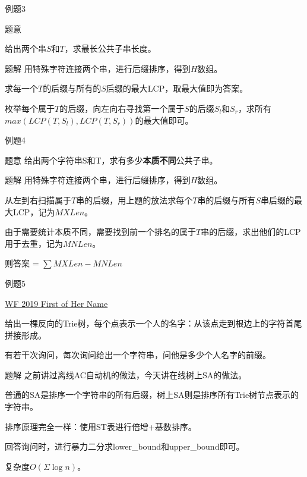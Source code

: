 \documentclass[usenames,dvipsnames]{ctexbeamer}		%
\begin{document}
\begin{frame}{例题3}
    
\begin{block}{题意}

给出两个串$S$和$T$，求最长公共子串长度。

\end{block}

\pause

\begin{block}{题解}
用特殊字符连接两个串，进行后缀排序，得到$H$数组。

求每一个$T$的后缀与所有的$S$后缀的最大LCP，取最大值即为答案。

枚举每个属于$T$的后缀，向左向右寻找第一个属于$S$的后缀$S_l$和$S_r$，求所有$max(LCP(T,S_l), LCP(T,S_r))$的最大值即可。
\end{block}
\end{frame}
\begin{frame}{例题4}

\begin{block}{题意}
给出两个字符串S和T，求有多少\textbf{本质不同}公共子串。
\end{block}
    
\pause

\begin{block}{题解}
用特殊字符连接两个串，进行后缀排序，得到$H$数组。

从左到右扫描属于$T$串的后缀，用上题的放法求每个$T$串的后缀与所有$S$串后缀的最大LCP，记为$MXLen$。

由于需要统计本质不同，需要找到前一个排名的属于$T$串的后缀，求出他们的LCP用于去重，记为$MNLen$。

则答案 = $\sum{MXLen - MNLen}$
\end{block}
\end{frame}

\begin{frame}{例题5}

\begin{block}{\href{https://ac.nowcoder.com/acm/problem/233969}{WF 2019 First of Her Name}}

给出一棵反向的Trie树，每个点表示一个人的名字：从该点走到根边上的字符首尾拼接形成。

有若干次询问，每次询问给出一个字符串，问他是多少个人名字的前缀。
\end{block}
    
\pause

\begin{block}{题解}
之前讲过离线AC自动机的做法，今天讲在线树上SA的做法。

\pause

普通的SA是排序一个字符串的所有后缀，树上SA则是排序所有Trie树节点表示的字符串。

\pause

排序原理完全一样：使用ST表进行倍增+基数排序。

\pause

回答询问时，进行暴力二分求lower\_bound和upper\_bound即可。

复杂度$O(\Sigma \log{n})$。
\end{block}
\end{frame}
\end{document}
